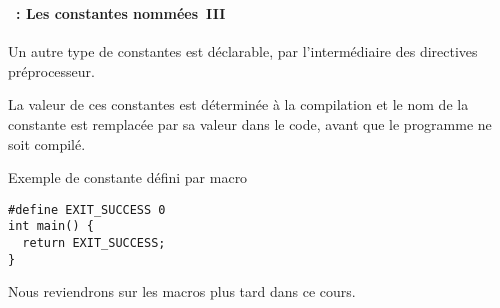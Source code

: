\begin{frame}[containsverbatim]
  \frametitle{\secname}
  \framesubtitle{\subsecname~: Les constantes nommées~III} 

  Un autre type de constantes est déclarable, par l'intermédiaire des directives préprocesseur.
  \vspace{0.5cm}
  \par
  La valeur de ces constantes est déterminée à la compilation et le nom de la constante est remplacée par sa valeur dans le code, avant que le programme ne soit compilé.
  \begin{block}{Exemple de constante défini par macro}
    \begin{verbatim}
#define EXIT_SUCCESS 0
int main() {
  return EXIT_SUCCESS;
}
    \end{verbatim}
  \end{block}
  Nous reviendrons sur les macros plus tard dans ce cours.
\end{frame}

